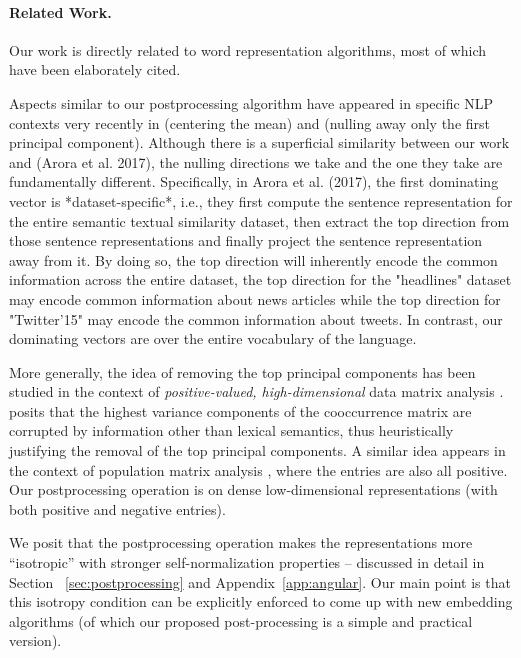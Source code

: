 \documentclass{article} \usepackage{acl2017,times}
\begin{document}
\paragraph{Related Work.} Our work is directly related to  word representation algorithms, most of which have been elaborately cited. 

 Aspects similar to  our  postprocessing algorithm have appeared in specific NLP contexts very recently in \citep{SAHLGREN16.102} (centering the mean) and \citep{arora2017simple} (nulling away only the first principal component). Although there is a superficial similarity between our work and (Arora et al. 2017), the  nulling directions we take and the one they take are fundamentally different. Specifically, in Arora et al. (2017), the first dominating vector  is *dataset-specific*, i.e., they first compute the sentence representation for the entire semantic textual similarity dataset, then extract the top direction from those sentence representations and finally project the sentence representation away from it. By doing so, the top direction will inherently encode the common information across the entire dataset, the top direction for the "headlines" dataset may encode common information about news articles while the top direction for "Twitter'15" may encode the common information about tweets. In contrast, our dominating vectors are over the entire vocabulary of the language.
 
 More generally, the idea of removing the top principal components has been studied in the context of {\em positive-valued, high-dimensional} data matrix analysis \citep{bullinaria2012extracting,price2006principal}. \citet{bullinaria2012extracting}  posits that the highest variance components of the cooccurrence matrix are corrupted by information other than lexical semantics, thus heuristically justifying the removal of the top  principal components.  A similar idea appears in the context of population matrix analysis  \citep{price2006principal}, where the entries are also all positive. Our  postprocessing operation is on dense low-dimensional representations (with both positive and negative entries). 
 
 We posit that the  postprocessing operation  makes the representations more ``isotropic'' with  stronger self-normalization  properties -- discussed in detail in Section ~\ref{sec:postprocessing} and Appendix~\ref{app:angular}.  Our main point is that this isotropy condition can be explicitly enforced to come up with new embedding algorithms (of which our proposed post-processing is a simple and practical version).
\end{document}
